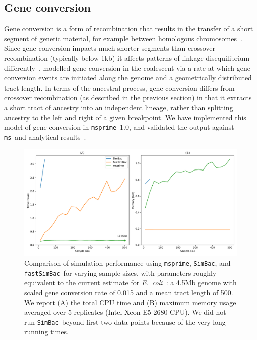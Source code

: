 \documentclass{article}
\newcommand{\msprime}[0]{\texttt{msprime}}
\newcommand{\ms}[0]{\texttt{ms}}
\newcommand{\SimBac}[0]{\texttt{SimBac}}
\newcommand{\FastSimBac}[0]{\texttt{fastSimBac}}
\begin{document}
\subsection*{Gene conversion}
Gene conversion is a form of recombination that results in the transfer
of a short segment of genetic material,
for example between homologous chromosomes~\citep{chen2007gene}.
Since gene conversion impacts much shorter segments than
crossover recombination (typically below 1kb) it
affects patterns of linkage disequilibrium differently~\citep{korunes2017gene}.
\cite{wiuf2000coalescent} modelled gene conversion in the coalescent
via a rate at which gene conversion events are initiated
along the genome and a geometrically distributed tract length.
In terms of the ancestral process, gene conversion differs from
crossover recombination (as described in the previous section)
in that it extracts a short tract of ancestry into
an independent lineage, rather than splitting ancestry
to the left and right of a given breakpoint.
We have implemented this model of gene
conversion in \msprime\ 1.0, and validated the output against
\ms\ and analytical results~\citep{wiuf2000coalescent}.

\begin{figure}
\begin{center}
\includegraphics[width=\textwidth]{figures/gc-perf}
\end{center}
\caption{\label{fig-gc-perf}Comparison of simulation performance
using \msprime, \SimBac, and \FastSimBac\ for varying sample sizes,
with parameters roughly equivalent to the current estimate
for \textit{E.~coli}~\citep{lapierre2016the}:
a 4.5Mb genome with scaled gene conversion rate of 0.015 and
a mean tract length of 500.
We report (A) the total CPU time and (B) maximum memory usage
averaged over 5 replicates (Intel Xeon E5-2680 CPU).
We did not run \SimBac\ beyond first two data points because
of the very long running times.}
\end{figure}
\end{document}
